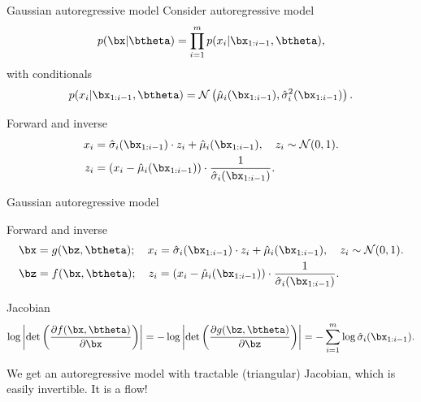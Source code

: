 \begin{frame}{Gaussian autoregressive model}
	Consider autoregressive model
	\[
		p(\bx | \btheta) = \prod_{i=1}^m p(x_i | \bx_{1:i - 1}, \btheta),
	\]
	with conditionals
	\[
		p(x_i | \bx_{1:i - 1}, \btheta) = \mathcal{N} \left(\hat{\mu}_i(\bx_{1:i-1}), \hat{\sigma}^2_i (\bx_{1:i-1})\right).
	\]
	\vspace{-0.5cm}
	\begin{block}{Forward and inverse}
		\vspace{-0.3cm}
		\begin{align*}
			x_i &= \hat{\sigma}_i (\bx_{1:i-1}) \cdot z_i + \hat{\mu}_i(\bx_{1:i-1}), \quad z_i \sim \mathcal{N}(0, 1). \\
			z_i &= \left(x_i - \hat{\mu}_i(\bx_{1:i-1}) \right) \cdot \frac{1}{\hat{\sigma}_i (\bx_{1:i-1}) }.
		\end{align*}
	\end{block}
\end{frame}
\begin{frame}{Gaussian autoregressive model}
	\begin{block}{Forward and inverse}
		\vspace{-0.3cm}
		\begin{align*}
			\bx &= g(\bz, \btheta); \quad x_i = \hat{\sigma}_i (\bx_{1:i-1}) \cdot z_i + \hat{\mu}_i(\bx_{1:i-1}), \quad z_i \sim \mathcal{N}(0, 1). \\
			\bz &= f(\bx, \btheta); \quad z_i = \left(x_i - \hat{\mu}_i(\bx_{1:i-1}) \right) \cdot \frac{1}{\hat{\sigma}_i (\bx_{1:i-1}) }.
		\end{align*}
	\vspace{-0.3cm}
	\end{block}
	\begin{block}{Jacobian}
		\vspace{-0.3cm}
		\[
		\log \left|\det \left( \frac{\partial f(\bx, \btheta)}{\partial \bx} \right) \right| = -\log \left|\det \left( \frac{\partial g(\bz, \btheta)}{\partial \bz} \right) \right| = - \sum_{i = 1}^m \log \hat{\sigma}_i (\bx_{1:i-1}).
		\]
		\vspace{-0.3cm}
	\end{block} 
	We get an autoregressive model with tractable (triangular) Jacobian, which is easily invertible. It is a flow!
\end{frame}
